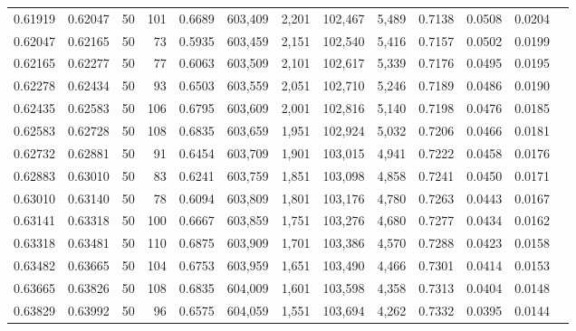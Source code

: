 \begin{tabular}{rrrrrrrrrrrrr}
0.61919 & 0.62047 &    50 & 101 &                                     0.6689 & 603,409 &   2,201 & 102,467 &   5,489 & 0.7138 & 0.0508 & 0.0204 \\
0.62047 & 0.62165 &    50 &  73 &                                     0.5935 & 603,459 &   2,151 & 102,540 &   5,416 & 0.7157 & 0.0502 & 0.0199 \\
0.62165 & 0.62277 &    50 &  77 &                                     0.6063 & 603,509 &   2,101 & 102,617 &   5,339 & 0.7176 & 0.0495 & 0.0195 \\
0.62278 & 0.62434 &    50 &  93 &                                     0.6503 & 603,559 &   2,051 & 102,710 &   5,246 & 0.7189 & 0.0486 & 0.0190 \\
0.62435 & 0.62583 &    50 & 106 &                                     0.6795 & 603,609 &   2,001 & 102,816 &   5,140 & 0.7198 & 0.0476 & 0.0185 \\
0.62583 & 0.62728 &    50 & 108 &                                     0.6835 & 603,659 &   1,951 & 102,924 &   5,032 & 0.7206 & 0.0466 & 0.0181 \\
0.62732 & 0.62881 &    50 &  91 &                                     0.6454 & 603,709 &   1,901 & 103,015 &   4,941 & 0.7222 & 0.0458 & 0.0176 \\
0.62883 & 0.63010 &    50 &  83 &                                     0.6241 & 603,759 &   1,851 & 103,098 &   4,858 & 0.7241 & 0.0450 & 0.0171 \\
0.63010 & 0.63140 &    50 &  78 &                                     0.6094 & 603,809 &   1,801 & 103,176 &   4,780 & 0.7263 & 0.0443 & 0.0167 \\
0.63141 & 0.63318 &    50 & 100 &                                     0.6667 & 603,859 &   1,751 & 103,276 &   4,680 & 0.7277 & 0.0434 & 0.0162 \\
0.63318 & 0.63481 &    50 & 110 &                                     0.6875 & 603,909 &   1,701 & 103,386 &   4,570 & 0.7288 & 0.0423 & 0.0158 \\
0.63482 & 0.63665 &    50 & 104 &                                     0.6753 & 603,959 &   1,651 & 103,490 &   4,466 & 0.7301 & 0.0414 & 0.0153 \\
0.63665 & 0.63826 &    50 & 108 &                                     0.6835 & 604,009 &   1,601 & 103,598 &   4,358 & 0.7313 & 0.0404 & 0.0148 \\
0.63829 & 0.63992 &    50 &  96 &                                     0.6575 & 604,059 &   1,551 & 103,694 &   4,262 & 0.7332 & 0.0395 & 0.0144 \\

\end{tabular}
